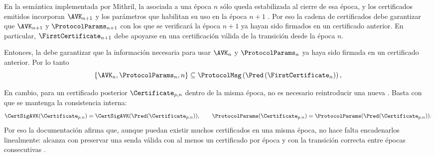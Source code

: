 En la semántica implementada por Mithril, la \StakeDistribution asociada a una época $n$ sólo queda estabilizada al cierre de esa época, y los certificados emitidos incorporan $\AVK_{n+1}$ y los parámetros que habilitan su uso en la época $n + 1$ \cite{MithrilDocsCertChain}. Por eso la cadena de certificados debe garantizar que $\AVK_{n+1}$ y $\ProtocolParams_{n+1}$ con los que se verificará la época $n+1$ ya hayan sido firmados en un certificado anterior. En particular, $\FirstCertificate_{n+1}$ debe apoyarse en una certificación válida de la transición desde la época $n$.

Entonces, la \CertificateChain debe garantizar que la información necesaria para usar $\AVK_n$ y $\ProtocolParams_n$ ya haya sido firmada en un certificado anterior. Por lo tanto
$$\{\AVK_n,\ProtocolParams_n,n\} \subseteq \ProtocolMsg \left(\Pred\left(\FirstCertificate_{n}\right)\right),
$$

En cambio, para un certificado posterior $\Certificate_{p,n}$ dentro de la misma época, no es necesario reintroducir una nueva \AVK. Basta con que se mantenga la consistencia interna:
$$
\CertSigAVK(\Certificate_{p,n}) = \CertSigAVK(\Pred(\Certificate_{p,n})), \qquad \ProtocolParams(\Certificate_{p,n}) = \ProtocolParams(\Pred(\Certificate_{p,n})).
$$
Por eso la documentación afirma que, aunque puedan existir muchos certificados en una misma época, no hace falta encadenarlos linealmente: alcanza con preservar una senda válida con al menos un certificado por época y con la transición correcta entre épocas consecutivas \cite{MithrilDocsCertChain}.

